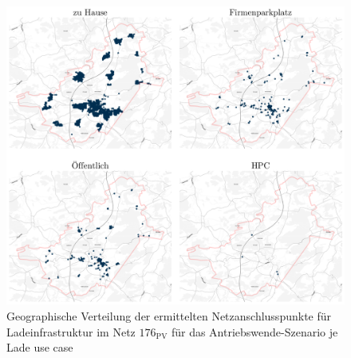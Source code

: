 \begin{figure}[H]
    \centering
    \includegraphics[width=\textwidth]{Bilder/cps_in_grid_176}
    \caption[Geographische Verteilung der ermittelten Netzanschlusspunkte für Ladeinfrastruktur im Netz \num{176} für das Antriebswende-Szenario je Lade use case]{Geographische Verteilung der ermittelten Netzanschlusspunkte für Ladeinfrastruktur im Netz \(176_{\text{PV}}\) für das Antriebswende-Szenario je Lade use case}\label{fig:cps_in_grid}
\end{figure}